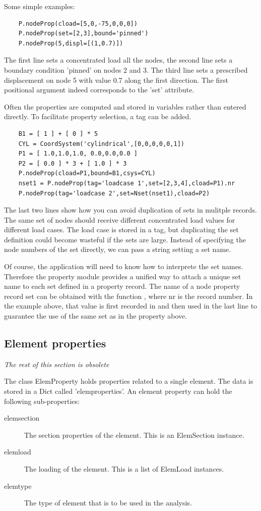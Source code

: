 {{{Some simple examples:
\begin{verbatim}
    P.nodeProp(cload=[5,0,-75,0,0,0])
    P.nodeProp(set=[2,3],bound='pinned')
    P.nodeProp(5,displ=[(1,0.7)])
\end{verbatim}
The first line sets a concentrated load all the nodes, the second line sets a boundary condition 'pinned' on nodes 2 and 3. The third line sets a prescribed displacement on node 5 with value 0.7 along the first direction.
The first positional argument indeed corresponds to the 'set' attribute.

Often the properties are computed and stored in variables rather than entered directly. To facilitate property selection, a tag can be added.
\begin{verbatim}
    B1 = [ 1 ] + [ 0 ] * 5
    CYL = CoordSystem('cylindrical',[0,0,0,0,0,1])
    P1 = [ 1.0,1.0,1.0, 0.0,0.0,0.0 ]
    P2 = [ 0.0 ] * 3 + [ 1.0 ] * 3 
    P.nodeProp(cload=P1,bound=B1,csys=CYL)
    nset1 = P.nodeProp(tag='loadcase 1',set=[2,3,4],cload=P1).nr
    P.nodeProp(tag='loadcase 2',set=Nset(nset1),cload=P2)
\end{verbatim}
The last two lines show how you can avoid duplication of sets in mulitple records. The same set of nodes should receive different concentrated load values for different load cases. The load case is stored in a tag, but duplicating the set definition could become wasteful if the sets are large. Instead of specifying the node numbers of the set directly, we can pass a string setting a set name.

Of course, the application will need to know how to interprete the set names.
Therefore the property module provides a unified way to attach a unique set name to each set defined in a property record. The name of a node property record set can be obtained with the function , where nr is the record number. In the example above, that value is first recorded in  and then used in the last line to guarantee the use of the same set as in the property above.


\subsection{Element properties}
\label{sec:elem-properties}



\emph{The rest of this section is obsolete}



The class ElemProperty holds properties related to a single element. The data is stored in a Dict called 'elemproperties'. An element property can hold the following sub-properties:
\begin{description}
\item [elemsection] The section properties of the element. This is an ElemSection instance.
\item [elemload] The loading of the element. This is a list of ElemLoad instances.
\item [elemtype] The type of element that is to be used in the analysis. 
\end{description}

}}}
